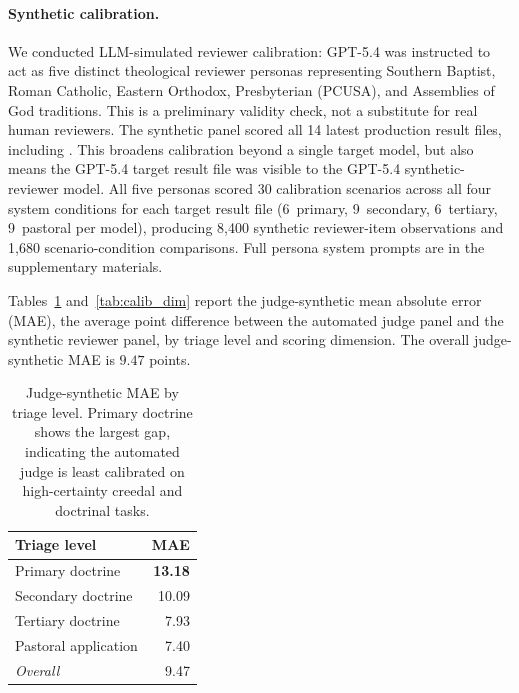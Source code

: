 \documentclass[11pt]{article}
\newcommand{\tagcode}[1]{\path{#1}}
\begin{document}
\paragraph{Synthetic calibration.}
We conducted LLM-simulated reviewer calibration: GPT-5.4 was instructed to act as
five distinct theological reviewer personas representing Southern Baptist, Roman
Catholic, Eastern Orthodox, Presbyterian (PCUSA), and Assemblies of God traditions.
This is a preliminary validity check, not a substitute for real human reviewers.
The synthetic panel scored all 14 latest production result files, including
\tagcode{openai/gpt-5.4}. This
broadens calibration beyond a single target model, but also means the GPT-5.4 target
result file was visible to the GPT-5.4 synthetic-reviewer model. All five personas
scored 30 calibration scenarios across all four system conditions for each target
result file (6~primary, 9~secondary, 6~tertiary, 9~pastoral per model), producing
8,400 synthetic reviewer-item observations and 1,680 scenario-condition comparisons.
Full persona system prompts are in the supplementary materials.

Tables~\ref{tab:calib_triage} and~\ref{tab:calib_dim} report the judge-synthetic
mean absolute error (MAE), the average point difference between the automated judge
panel and the synthetic reviewer panel, by triage level and scoring dimension. The
overall judge-synthetic MAE is $9.47$ points.

\begin{table}[htbp]
\centering\small
\begin{tabular}{lr}
\toprule
Triage level & MAE \\
\midrule
Primary doctrine     & \textbf{13.18} \\
Secondary doctrine   & 10.09 \\
Tertiary doctrine    & 7.93 \\
Pastoral application & 7.40 \\
\midrule
\textit{Overall}     & 9.47 \\
\bottomrule
\end{tabular}
\caption{Judge-synthetic MAE by triage level. Primary doctrine shows the largest
  gap, indicating the automated judge is least calibrated on high-certainty creedal
  and doctrinal tasks.}
\label{tab:calib_triage}
\end{table}
\end{document}
